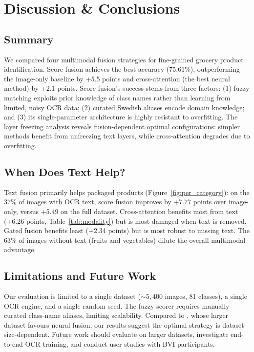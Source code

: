 \documentclass[10pt,twocolumn]{article}
\begin{document}
\section{Discussion \& Conclusions}
\label{sec:conclusion}

\subsection{Summary}

We compared four multimodal fusion strategies for fine-grained grocery product identification. Score fusion achieves the best accuracy (75.61\%), outperforming the image-only baseline by +5.5 points and cross-attention (the best neural method) by +2.1 points. Score fusion's success stems from three factors: (1) fuzzy matching exploits prior knowledge of class names rather than learning from limited, noisy OCR data; (2) curated Swedish aliases encode domain knowledge; and (3) its single-parameter architecture is highly resistant to overfitting. The layer freezing analysis reveals fusion-dependent optimal configurations: simpler methods benefit from unfreezing text layers, while cross-attention degrades due to overfitting.

\subsection{When Does Text Help?}

Text fusion primarily helps packaged products (Figure~\ref{fig:per_category}): on the 37\% of images with OCR text, score fusion improves by +7.77 points over image-only, versus +5.49 on the full dataset. Cross-attention benefits most from text (+6.26 points, Table~\ref{tab:modality}) but is most damaged when text is removed. Gated fusion benefits least (+2.34 points) but is most robust to missing text. The 63\% of images without text (fruits and vegetables) dilute the overall multimodal advantage.

\subsection{Limitations and Future Work}

Our evaluation is limited to a single dataset (${\sim}5,400$ images, 81 classes), a single OCR engine, and a single random seed. The fuzzy scorer requires manually curated class-name aliases, limiting scalability. Compared to \citet{pettersson2024multimodal}, whose larger dataset favours neural fusion, our results suggest the optimal strategy is dataset-size-dependent. Future work should evaluate on larger datasets, investigate end-to-end OCR training, and conduct user studies with BVI participants.
\end{document}
